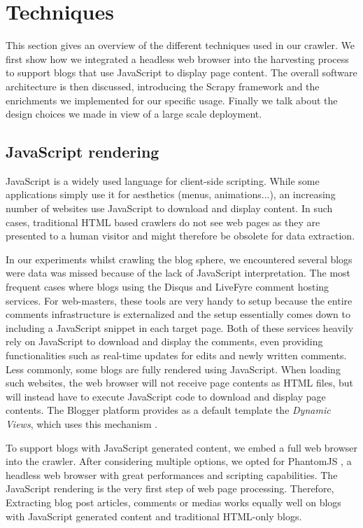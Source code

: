 \section{Techniques}

This section gives an overview of the different techniques used in our crawler. We first show how we integrated a headless web browser into the harvesting process to support blogs that use JavaScript to display page content. The overall software architecture is then discussed, introducing the Scrapy framework and the enrichments we implemented for our specific usage. Finally we talk about the design choices we made in view of a large scale deployment.


\subsection{JavaScript rendering}
JavaScript is a widely used language for client-side scripting. While some applications simply use it for aesthetics (menus, animations...), an increasing number of websites use JavaScript to download and display content. In such cases, traditional HTML based crawlers do not see web pages as they are presented to a human visitor and might therefore be obsolete for data extraction.

In our experiments whilst crawling the blog sphere, we encountered several blogs were data was missed because of the lack of JavaScript interpretation. The most frequent cases where blogs using the Disqus \cite{disqus2013} and LiveFyre \cite{livefyre2013} comment hosting services. For web-masters, these tools are very handy to setup because the entire comments infrastructure is externalized and the setup essentially comes down to including a JavaScript snippet in each target page. Both of these services heavily rely on JavaScript to download and display the comments, even providing functionalities such as real-time updates for edits and newly written comments. Less commonly, some blogs are fully rendered using JavaScript. When loading such websites, the web browser will not receive page contents as HTML files, but will instead have to execute JavaScript code to download and display page contents. The Blogger platform provides as a default template the \emph{Dynamic Views}, which uses this mechanism \cite{antinharasymiv2011}.

To support blogs with JavaScript generated content, we embed a full web browser into the crawler. After considering multiple options, we opted for PhantomJS \cite{phantomjs2013}, a headless web browser with great performances and scripting capabilities. The JavaScript rendering is the very first step of web page processing. Therefore, Extracting blog post articles, comments or medias works equally well on blogs with JavaScript generated content and traditional HTML-only blogs.


